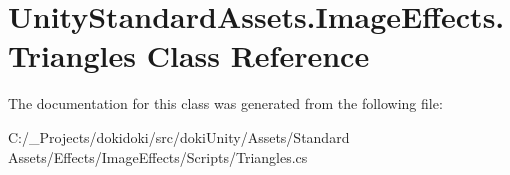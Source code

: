 \hypertarget{class_unity_standard_assets_1_1_image_effects_1_1_triangles}{}\section{Unity\+Standard\+Assets.\+Image\+Effects.\+Triangles Class Reference}
\label{class_unity_standard_assets_1_1_image_effects_1_1_triangles}


The documentation for this class was generated from the following file\+:\begin{DoxyCompactItemize}
\item 
C\+:/\+\_\+\+Projects/dokidoki/src/doki\+Unity/\+Assets/\+Standard Assets/\+Effects/\+Image\+Effects/\+Scripts/Triangles.\+cs\end{DoxyCompactItemize}

